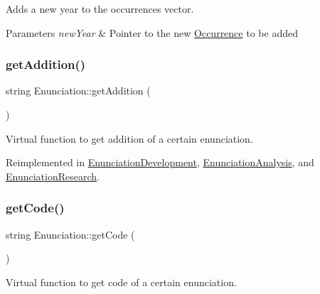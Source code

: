 Adds a new year to the occurrences vector. 


\begin{DoxyParams}{Parameters}
{\em new\+Year} & Pointer to the new \hyperlink{class_occurrence}{Occurrence} to be added \\
\hline
\end{DoxyParams}
\mbox{\label{class_enunciation_ad0bf6d8d34f6246cd5bc674b15b5958b}} 
\subsubsection{\texorpdfstring{get\+Addition()}{getAddition()}}
{\footnotesize\ttfamily string Enunciation\+::get\+Addition (\begin{DoxyParamCaption}{ }\end{DoxyParamCaption})\hspace{0.3cm}{\ttfamily [virtual]}}



Virtual function to get addition of a certain enunciation. 



Reimplemented in \hyperlink{class_enunciation_development_a5480d39ba25c6fac36d07d3aad6b6de9}{Enunciation\+Development}, \hyperlink{class_enunciation_analysis_a19fa90c811af4addfe77c4109520a8e1}{Enunciation\+Analysis}, and \hyperlink{class_enunciation_research_ad5021c15b3cf600191d21aec467529d4}{Enunciation\+Research}.

\mbox{\label{class_enunciation_a2c27d4c83302dd7d21e1064c9e4ec97d}} 
\subsubsection{\texorpdfstring{get\+Code()}{getCode()}}
{\footnotesize\ttfamily string Enunciation\+::get\+Code (\begin{DoxyParamCaption}{ }\end{DoxyParamCaption})\hspace{0.3cm}{\ttfamily [virtual]}}



Virtual function to get code of a certain enunciation. 




